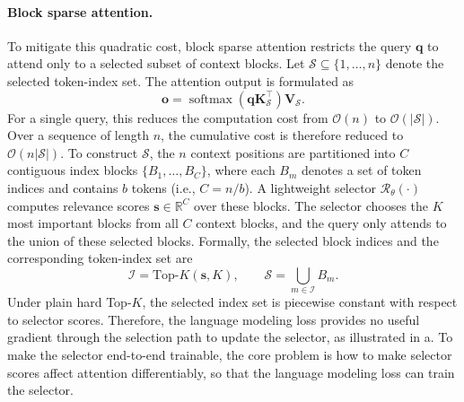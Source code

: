 \paragraph{Block sparse attention.}
To mitigate this quadratic cost, block sparse attention \cite{zhangsurvey,sun2025efficient} restricts the query $\mathbf{q}$ to attend only to a selected subset of context blocks.
Let $\mathcal{S}\subseteq\{1,\ldots,n\}$ denote the selected token-index set. 
The attention output is formulated as
\begin{equation}
    \mathbf{o}
    =
    \operatorname{softmax}
    \left(
        \mathbf{q}\mathbf{K}_{\mathcal{S}}^\top
    \right)
    \mathbf{V}_{\mathcal{S}}.
    \label{eqn:spa}
\end{equation}
For a single query, this reduces the computation cost from $\mathcal{O}(n)$ to $\mathcal{O}(|\mathcal{S}|)$.
Over a sequence of length $n$, the cumulative cost is therefore reduced to $\mathcal{O}(n|\mathcal{S}|)$.
To construct $\mathcal{S}$, the $n$ context positions are partitioned into $C$ contiguous index blocks $\{B_1,\ldots,B_C\}$, where each $B_m$ denotes a set of token indices and contains $b$ tokens (i.e., $C=n/b$).
A lightweight selector $\mathcal{R}_\theta(\cdot)$ computes relevance scores $\mathbf{s}\in\mathbb{R}^{C}$ over these blocks.
The selector chooses the $K$ most important blocks from all $C$ context blocks, and the query only attends to the union of these selected blocks.
Formally, the selected block indices and the corresponding token-index set are
\begin{equation}
    \mathcal{I}
    =
    \text{Top-}K(\mathbf{s}, K),
    \qquad
    \mathcal{S}
    =
    \bigcup_{m\in\mathcal{I}} B_m .
    \label{eqn:selected_context}
\end{equation}
Under plain hard Top-$K$, the selected index set is piecewise constant with respect to selector scores. Therefore, the language modeling loss provides no useful gradient through the selection path to update the selector, as illustrated in a.
To make the selector end-to-end trainable, the core problem is how to make selector scores affect attention differentiably, so that the language modeling loss can train the selector.

